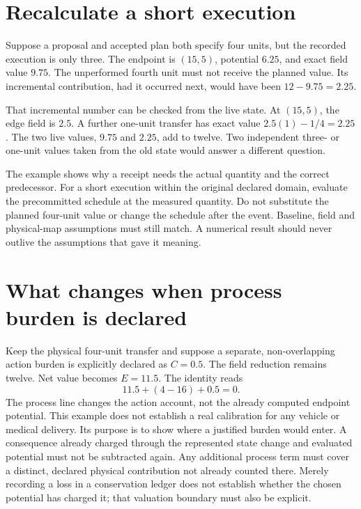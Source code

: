 \section{Recalculate a short execution}

Suppose a proposal and accepted plan both specify four units, but the recorded execution is only three. The endpoint is \((15,5)\), potential \(6.25\), and exact field value \(9.75\). The unperformed fourth unit must not receive the planned value. Its incremental contribution, had it occurred next, would have been \(12-9.75=2.25\).

That incremental number can be checked from the live state. At \((15,5)\), the edge field is \(2.5\). A further one-unit transfer has exact value \(2.5(1)-1/4=2.25\). The two live values, \(9.75\) and \(2.25\), add to twelve. Two independent three- or one-unit values taken from the old state would answer a different question.

The example shows why a receipt needs the actual quantity and the correct predecessor. For a short execution within the original declared domain, evaluate the precommitted schedule at the measured quantity. Do not substitute the planned four-unit value or change the schedule after the event. Baseline, field and physical-map assumptions must still match. A numerical result should never outlive the assumptions that gave it meaning.

\section{What changes when process burden is declared}

Keep the physical four-unit transfer and suppose a separate, non-overlapping action burden is explicitly declared as \(C=0.5\). The field reduction remains twelve. Net value becomes \(E=11.5\). The identity reads
\begin{equation}
11.5+(4-16)+0.5=0.
\end{equation}
The process line changes the action account, not the already computed endpoint potential. This example does not establish a real calibration for any vehicle or medical delivery. Its purpose is to show where a justified burden would enter. A consequence already charged through the represented state change and evaluated potential must not be subtracted again. Any additional process term must cover a distinct, declared physical contribution not already counted there. Merely recording a loss in a conservation ledger does not establish whether the chosen potential has charged it; that valuation boundary must also be explicit.

